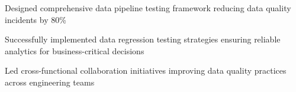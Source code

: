 \begin{zitemize}
\item Designed comprehensive data pipeline testing framework reducing data quality incidents by 80\%
\item Successfully implemented data regression testing strategies ensuring reliable analytics for business-critical decisions
\item Led cross-functional collaboration initiatives improving data quality practices across engineering teams
\end{zitemize}
